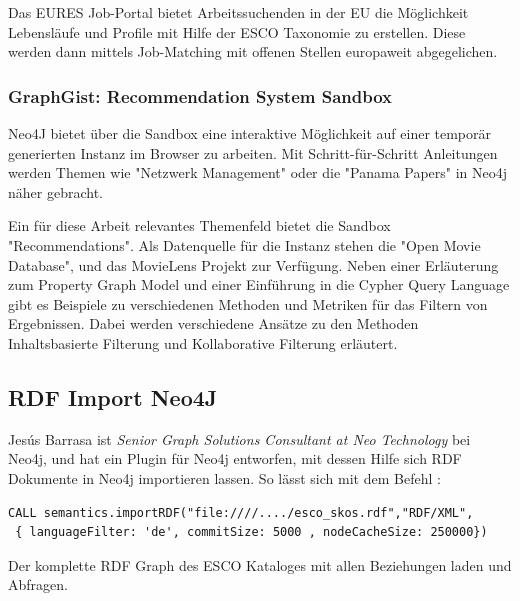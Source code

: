 Das EURES Job-Portal bietet Arbeitssuchenden in der EU die Möglichkeit Lebensläufe und Profile mit Hilfe der ESCO Taxonomie zu erstellen. Diese werden dann mittels Job-Matching mit offenen Stellen europaweit abgegelichen.

\subsubsection{GraphGist: Recommendation System Sandbox}\label{recommender}

Neo4J bietet über die Sandbox eine interaktive Möglichkeit auf einer temporär generierten Instanz im Browser zu arbeiten. Mit Schritt-für-Schritt Anleitungen werden Themen wie "Netzwerk Management" oder die "Panama Papers" in Neo4j näher gebracht. 

Ein für diese Arbeit relevantes Themenfeld bietet die Sandbox "Recommendations".\cite{neo4j} Als Datenquelle für die Instanz stehen die "Open Movie Database"\cite{omdb}, und das MovieLens Projekt\cite{grouplens_2016} zur Verfügung.
Neben einer Erläuterung zum Property Graph Model und einer Einführung in die Cypher Query Language gibt es Beispiele zu verschiedenen Methoden und Metriken für das Filtern von Ergebnissen. Dabei werden verschiedene Ansätze zu den Methoden Inhaltsbasierte Filterung und Kollaborative Filterung erläutert. 
\subsection{RDF Import Neo4J}

Jesús Barrasa ist  \textit{Senior Graph Solutions Consultant at Neo Technology} bei Neo4j, und hat ein Plugin für Neo4j entworfen, mit dessen Hilfe sich RDF Dokumente in Neo4j importieren lassen. So lässt sich mit dem Befehl :
\vspace{1em}

\begin{lstlisting}[frame=htrbl, caption={Das Listing zeigt einen Funktionsaufruf über die Neo4j}, label={lst:result2}]
CALL semantics.importRDF("file:////..../esco_skos.rdf","RDF/XML",
 { languageFilter: 'de', commitSize: 5000 , nodeCacheSize: 250000})	
\end{lstlisting}

Der komplette RDF Graph des ESCO Kataloges mit allen Beziehungen laden und Abfragen.


